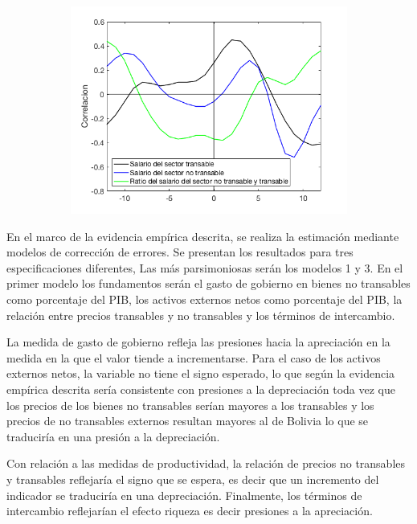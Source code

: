 \documentclass[12pt,letterpaper]{article}
\begin{document}
\begin{figure}
   \begin{subfigure}[b]{0.48\textwidth}
       \includegraphics[width=\textwidth]{fig18}
    \end{subfigure}
\end{figure}

En el marco de la evidencia empírica descrita, se realiza la estimación mediante modelos de corrección de errores. Se presentan los resultados para tres especificaciones diferentes, Las más parsimoniosas serán los modelos 1 y 3. En el primer modelo los fundamentos serán el gasto de gobierno en bienes no transables como porcentaje del PIB, los activos externos netos como porcentaje del PIB, la relación entre precios transables y no transables y los términos de intercambio.

La medida de gasto de gobierno refleja las presiones hacia la apreciación en la medida en la que el valor tiende a incrementarse. Para el caso de los activos externos netos, la variable no tiene el signo esperado, lo que según la evidencia empírica descrita sería consistente con presiones a la depreciación toda vez que los precios de los bienes no transables serían mayores a los transables y los precios de no transables externos resultan mayores al de Bolivia lo que se traduciría en una presión a la depreciación. 

Con relación a las medidas de productividad, la relación de precios no transables y transables reflejaría el signo que se espera, es decir que un incremento del indicador se traduciría en una depreciación. Finalmente, los términos de intercambio reflejarían el efecto riqueza es decir presiones a la apreciación. 
\end{document}
